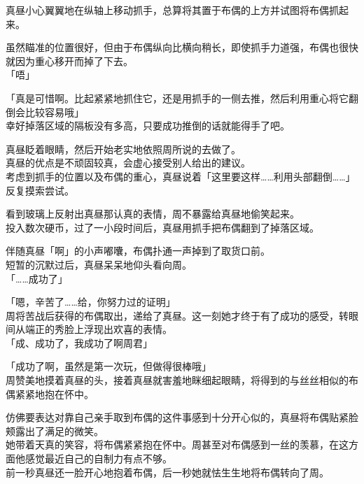 真昼小心翼翼地在纵轴上移动抓手，总算将其置于布偶的上方并试图将布偶抓起来。

虽然瞄准的位置很好，但由于布偶纵向比横向稍长，即使抓手力道强，布偶也很快就因为重心移开而掉了下去。\\

「唔」

「真是可惜啊。比起紧紧地抓住它，还是用抓手的一侧去推，然后利用重心将它翻倒会比较容易哦」\\

幸好掉落区域的隔板没有多高，只要成功推倒的话就能得手了吧。

真昼眨着眼睛，然后开始老实地依照周所说的去做了。\\

真昼的优点是不顽固较真，会虚心接受别人给出的建议。\\

考虑到抓手的位置以及布偶的重心，真昼说着「这里要这样……利用头部翻倒……」反复摸索尝试。

看到玻璃上反射出真昼那认真的表情，周不暴露给真昼地偷笑起来。\\

投入数次硬币，过了一小段时间后，真昼用抓手把布偶翻到了掉落区域。

伴随真昼「啊」的小声嘟囔，布偶扑通一声掉到了取货口前。\\

短暂的沉默过后，真昼呆呆地仰头看向周。\\

「……成功了」

「嗯，辛苦了……给，你努力过的证明」\\

周将苦战后获得的布偶取出，递给了真昼。这一刻她才终于有了成功的感受，转眼间从端正的秀脸上浮现出欢喜的表情。\\

「成、成功了，我成功了啊周君」

「成功了啊，虽然是第一次玩，但做得很棒哦」\\

周赞美地摸着真昼的头，接着真昼就害羞地眯细起眼睛，将得到的与丝丝相似的布偶紧紧地抱在怀中。

仿佛要表达对靠自己亲手取到布偶的这件事感到十分开心似的，真昼将布偶贴紧脸颊露出了满足的微笑。\\

她带着天真的笑容，将布偶紧紧抱在怀中。周甚至对布偶感到一丝的羡慕，在这方面他感觉最近自己的自制力有点不够。\\

前一秒真昼还一脸开心地抱着布偶，后一秒她就怯生生地将布偶转向了周。\\

